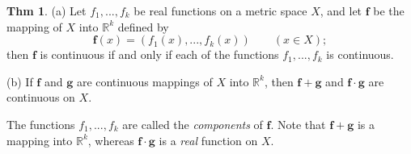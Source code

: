\documentclass{article}
\theoremstyle{definition}
\newtheorem{theorem}[definition]{Thm}
\begin{document}
\begin{theorem}
    \leavevmode\par
    (a) Let $f_1, ..., f_k$ be real functions on a metric space $X$, and let $\mathbf{f}$ be the mapping of $X$ into $\mathbb{R}^k$ defined by
    \[
    \mathbf{f}(x)=(f_1(x),...,f_k(x))\qquad (x\in X);
    \]
    \hspace*{3em}then $\mathbf{f}$ is continuous if and only if each of the functions $f_1,...,f_k$ is continuous.\par
    (b) If $\mathbf{f}$ and $\mathbf{g}$ are continuous mappings of $X$ into $\mathbb{R}^k$, then $\mathbf{f}+\mathbf{g}$ and $\mathbf{f}\cdot\mathbf{g}$ are continuous on $X$.\par
    The functions $f_1,...,f_k$ are called the \textit{components} of $\mathbf{f}$. Note that $\mathbf{f}+\mathbf{g}$ is a mapping into $\mathbb{R}^k$, whereas $\mathbf{f}\cdot\mathbf{g}$ is a \textit{real} function on $X$.
\end{theorem}
\end{document}
